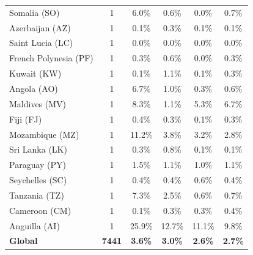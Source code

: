 {\begin{table}[ht]
{\begin{tabular}{lccccc}
Somalia (SO)          &     1  & \cellcolor{red5}  6.0\% & \cellcolor{green1} 0.6\% & \cellcolor{green1} 0.0\% & \cellcolor{green0} 0.7\% \\  %
Azerbaijan (AZ)       &     1  & \cellcolor{green1} 0.1\% & \cellcolor{red5}  0.3\% & \cellcolor{green1} 0.1\% & \cellcolor{green1} 0.1\% \\  %
Saint Lucia (LC)      &     1  & 0.0\% & 0.0\% & 0.0\% & 0.0\% \\  %
French Polynesia (PF)  &     1  & 0.3\% & \cellcolor{red5}  0.6\% & \cellcolor{green5}  0.0\% & 0.3\% \\  %
Kuwait (KW)           &     1  & \cellcolor{green1} 0.1\% & \cellcolor{red5}  1.1\% & \cellcolor{green1} 0.1\% & \cellcolor{green0} 0.3\% \\  %
Angola (AO)           &     1  & \cellcolor{red5}  6.7\% & \cellcolor{green0} 1.0\% & \cellcolor{green1} 0.3\% & \cellcolor{green1} 0.6\% \\  %
Maldives (MV)         &     1  & \cellcolor{red5}  8.3\% & \cellcolor{green5}  1.1\% & 5.3\% & \cellcolor{red1} 6.7\% \\  %
Fiji (FJ)             &     1  & \cellcolor{red5}  0.4\% & 0.3\% & \cellcolor{green5}  0.1\% & 0.3\% \\  %
Mozambique (MZ)       &     1  & \cellcolor{red5}  11.2\% & \cellcolor{green0} 3.8\% & \cellcolor{green1} 3.2\% & \cellcolor{green1} 2.8\% \\  %
Sri Lanka (LK)        &     1  & 0.3\% & \cellcolor{red5}  0.8\% & \cellcolor{green1} 0.1\% & \cellcolor{green1} 0.1\% \\  %
Paraguay (PY)         &     1  & \cellcolor{red5}  1.5\% & \cellcolor{green0} 1.1\% & \cellcolor{green5}  1.0\% & \cellcolor{green0} 1.1\% \\  %
Seychelles (SC)       &     1  & \cellcolor{green1} 0.4\% & \cellcolor{green1} 0.4\% & \cellcolor{red5}  0.6\% & \cellcolor{green1} 0.4\% \\  %
Tanzania (TZ)         &     1  & \cellcolor{red5}  7.3\% & 2.5\% & \cellcolor{green2} 0.6\% & \cellcolor{green2} 0.7\% \\  %
Cameroon (CM)         &     1  & \cellcolor{green5}  0.1\% & 0.3\% & 0.3\% & \cellcolor{red5}  0.4\% \\  %
Anguilla (AI)         &     1  & \cellcolor{red5}  25.9\% & \cellcolor{green0} 12.7\% & \cellcolor{green1} 11.1\% & \cellcolor{green2} 9.8\% \\  %
\hline
\textbf{Global}            & \textbf{ 7441} & \textbf{3.6\%} & \textbf{3.0\%} & \textbf{2.6\%} & \textbf{2.7\%} \\ %



\end{tabular}}
\end{table}}
